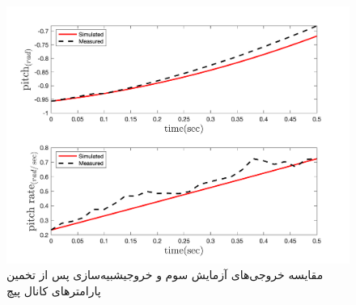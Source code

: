 \begin{figure}[H]
	\includegraphics[width=12cm]{../../Figures/RCP/pitch_parameter_estimation/RCP_pitch_S3.png}
	\centering
	\caption{مقايسه خروجی‌های آزمايش سوم و خروجیشبیه‌سازی پس از تخمین پارامترهای کانال پیچ}
	\label{pitch_ps3}
\end{figure}